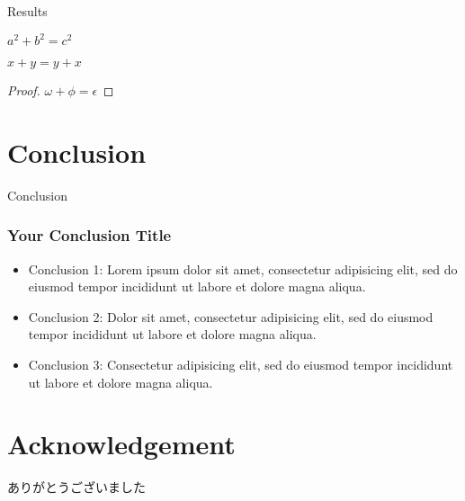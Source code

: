 \documentclass[10pt]{beamer}
\begin{document}
\begin{frame}{Results}
    \begin{theorem}[Pythagoras] 
      $ a^2 + b^2 = c^2$
    \end{theorem}
    \begin{corollary}
     $ x + y = y + x  $
    \end{corollary}
    \begin{proof}
     $\omega +\phi = \epsilon $
    \end{proof}
\end{frame}


\section{Conclusion}

\begin{frame}{Conclusion}
    \frametitle{Your Conclusion Title}
	\begin{itemize}
	    \item Conclusion 1: Lorem ipsum dolor sit amet, consectetur adipisicing elit, sed do eiusmod tempor incididunt ut labore et dolore magna aliqua.
            \item Conclusion 2: Dolor sit amet, consectetur adipisicing elit, sed do eiusmod tempor incididunt ut labore et dolore magna aliqua.
            \item Conclusion 3: Consectetur adipisicing elit, sed do eiusmod tempor incididunt ut labore et dolore magna aliqua.
	\end{itemize}
\end{frame}


\section*{Acknowledgement}  
\begin{frame}
\textcolor{ehimeColor}{\Huge{\centerline{ありがとうございました}}}
\end{frame}
\end{document}
